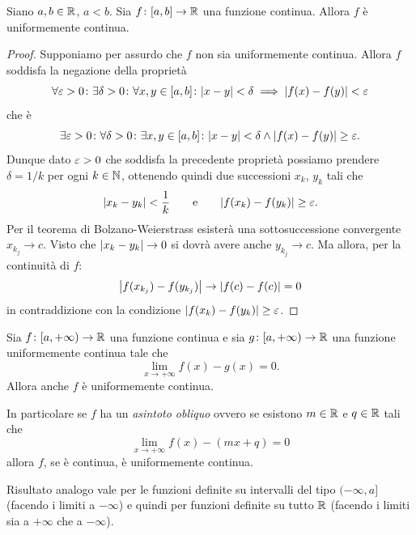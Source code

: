 \begin{theorem}
  \label{th:heine_cantor}%
  \mymark{***}%
Siano $a,b\in {\mathbb R}$, $a<b$.
Sia $f\colon [a,b]\to {\mathbb R}$ una funzione continua.
Allora $f$ è uniformemente continua.
\end{theorem}
%
\begin{proof}
\mymark{***}%
Supponiamo per assurdo che $f$ non sia uniformemente continua. Allora
$f$ soddisfa la negazione della proprietà
\[
 \forall \varepsilon>0\colon \exists \delta > 0 \colon
 \forall x,y\in [a,b] \colon {\left|x-y\right|} < \delta \implies {\left|f(x)-f(y)\right|} < \varepsilon
\]
che è
\[
 \exists \varepsilon>0\colon \forall \delta > 0 \colon
 \exists x,y \in [a,b] \colon {\left|x-y\right|} < \delta \land {\left|f(x)-f(y)\right|} \ge \varepsilon.
\]
Dunque dato $\varepsilon>0$ che soddisfa la precedente proprietà possiamo
prendere $\delta=1/k$
per ogni $k\in {\mathbb N}$, ottenendo quindi due successioni $x_k$, $y_k$ tali che
\[
  {\left|x_k-y_k\right|} < \frac 1 k \qquad\text{e}\qquad {\left|f(x_k) - f(y_k)\right|} \ge \varepsilon.
\]
Per il teorema di Bolzano-Weierstrass esisterà una sottosuccessione convergente $x_{k_j} \to c$.
Visto che ${\left|x_k-y_k\right|}\to 0$ si dovrà avere anche $y_{k_j}\to c$.
Ma allora, per la continuità di $f$:
\[
 {\left|f(x_{k_j})-f(y_{k_j})\right|} \to {\left|f(c) - f(c)\right|} = 0
\]
in contraddizione con la condizione ${\left|f(x_k)-f(y_k)\right|}\ge \varepsilon$.
\end{proof}

\begin{theorem}
Sia $f\colon [a,+\infty) \to {\mathbb R}$ una funzione continua e sia $g\colon [a,+\infty) \to {\mathbb R}$ una funzione uniformemente continua tale che
\[
  \lim_{x\to +\infty} f(x) - g(x) = 0.
\]
Allora anche $f$ è uniformemente continua.

In particolare se $f$ ha un \emph{asintoto obliquo}%
%
 ovvero se esistono $m\in {\mathbb R}$ e $q\in {\mathbb R}$ tali che
\[
  \lim_{x\to +\infty} f(x) - (mx + q)  = 0
\]
allora $f$, se è continua, è uniformemente continua.

Risultato analogo vale per le funzioni definite su intervalli del tipo $(-\infty,a]$ (facendo i limiti a $-\infty$) e quindi per funzioni definite su tutto ${\mathbb R}$ (facendo i limiti sia a $+\infty$ che a $-\infty$).
\end{theorem}

